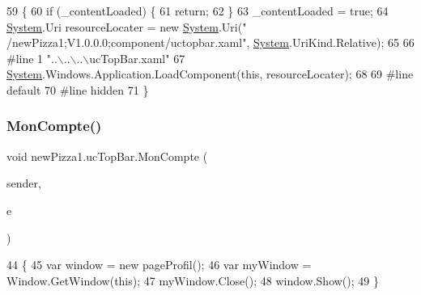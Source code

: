 \begin{DoxyCode}
59                                           \{
60             \textcolor{keywordflow}{if} (\_contentLoaded) \{
61                 \textcolor{keywordflow}{return};
62             \}
63             \_contentLoaded = \textcolor{keyword}{true};
64             \hyperlink{namespaceSystem}{System}.Uri resourceLocater = \textcolor{keyword}{new} \hyperlink{namespaceSystem}{System}.Uri(\textcolor{stringliteral}{"
      /newPizza1;V1.0.0.0;component/uctopbar.xaml"}, \hyperlink{namespaceSystem}{System}.UriKind.Relative);
65             
66 \textcolor{preprocessor}{            #line 1 "..\(\backslash\)..\(\backslash\)..\(\backslash\)ucTopBar.xaml"}
67             \hyperlink{namespaceSystem}{System}.Windows.Application.LoadComponent(\textcolor{keyword}{this}, resourceLocater);
68             
69 \textcolor{preprocessor}{            #line default}
70 \textcolor{preprocessor}{            #line hidden}
71         \}
\end{DoxyCode}
\mbox{\label{classnewPizza1_1_1ucTopBar_ada4587551ec61f2e8901f56ad05d8d84}} 
\subsubsection{\texorpdfstring{Mon\+Compte()}{MonCompte()}}
{\footnotesize\ttfamily void new\+Pizza1.\+uc\+Top\+Bar.\+Mon\+Compte (\begin{DoxyParamCaption}\item[{object}]{sender,  }\item[{Routed\+Event\+Args}]{e }\end{DoxyParamCaption})\hspace{0.3cm}{\ttfamily [inline]}}


\begin{DoxyCode}
44         \{
45             var window = \textcolor{keyword}{new} pageProfil();
46             var myWindow = Window.GetWindow(\textcolor{keyword}{this});
47             myWindow.Close();
48             window.Show();
49         \}
\end{DoxyCode}
\mbox{\label{classnewPizza1_1_1ucTopBar_aadaac61e856989e2d021405a3265ee63}} 
